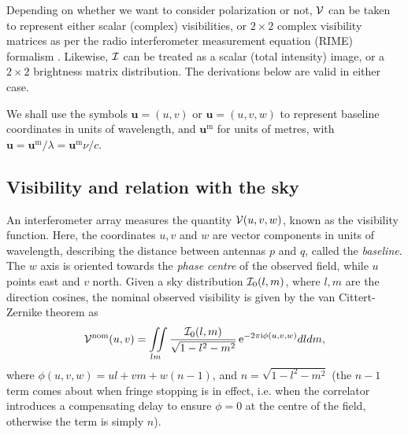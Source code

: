 \documentclass[useAMS,usenatbib]{mn2e}
\newcommand{\ee}{\mathrm{e}}
\newcommand{\ii}{\mathrm{i}}
\begin{document}
Depending on whether we want to consider polarization or not, $\mathcal{V}$ can be taken to represent either 
scalar (complex) visibilities, or $2\times2$ complex visibility matrices  as per the radio interferometer 
measurement equation (RIME) formalism \citep{smirnov2011revisiting}. Likewise, $\mathcal{I}$ can be treated as a scalar 
(total intensity) image, or a $2\times2$ brightness matrix distribution. The derivations below 
are valid in either case.

We shall use the symbols $\mathbf{u}=(u,v)$ or $\mathbf{u}=(u,v,w)$ to represent baseline coordinates in units of wavelength, and 
$\mathbf{u}^\mathrm{m}$ for units of metres, with $\mathbf{u} = \mathbf{u}^\mathrm{m}/\lambda = \mathbf{u}^\mathrm{m}\nu/c$.

\subsection{Visibility and relation with the sky}
\label{sec:visSky}
An interferometer array measures the quantity $\mathcal{V}(u,v,w)$, known as the visibility function.
Here, the coordinates $u,v$ and $w$ are vector components in units of wavelength, describing the distance between 
antennas $p$ and $q$, called the \emph{baseline}. The $w$ axis is oriented towards the \emph{phase centre} of the observed field,
while $u$ points east and $v$ north. Given a sky distribution $\mathcal{I}_0(l,m)$, where $l,m$ are the direction cosines,
the nominal observed visibility is given by the van 
Cittert-Zernike theorem \citep{thompson1999fundamentals,thompson2001fundamentals} as
\begin{equation}
\VV^\mathrm{nom}(u,v) =\iint\limits_{lm} \frac{\II_0(l,m)}{\sqrt{1-l^2 - m^2}}\,\ee^{-2\pi\ii\phi (u,v,w)}dldm, \label{eq:visSky:nom}
\end{equation} 
where $\phi(u,v,w)=ul+vm+w(n-1)$, and $n=\sqrt{1-l^2 - m^2}$ (the $n-1$ term comes about when fringe 
stopping is in effect, i.e. when 
the correlator introduces a compensating delay to ensure $\phi=0$ at the centre of the field, otherwise the term is simply $n$). 
\end{document}
